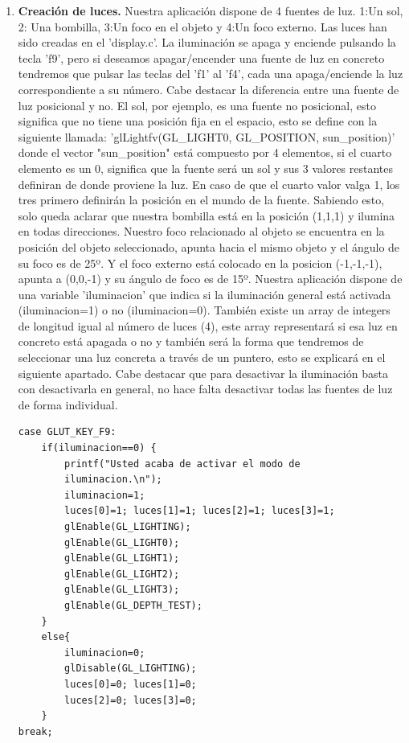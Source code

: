 \documentclass[12pt,a4paper]{article}
\begin{document}
\begin{enumerate}
\item \textbf{Creación de luces.}
Nuestra aplicación dispone de 4 fuentes de luz. 1:Un sol, 2: Una bombilla, 3:Un foco en el objeto y 4:Un foco externo. Las luces han sido creadas en el 'display.c'. La iluminación se apaga y enciende pulsando la tecla 'f9', pero si deseamos apagar/encender una fuente de luz en concreto tendremos que pulsar las teclas del 'f1' al 'f4', cada una apaga/enciende la luz correspondiente a su número.\newline
Cabe destacar la diferencia entre una fuente de luz posicional y no. El sol, por ejemplo, es una fuente no posicional, esto significa que no tiene una posición fija en el espacio, esto se define con la siguiente llamada: 'glLightfv(GL\_LIGHT0, GL\_POSITION, sun\_position)' donde el vector "sun\_position" está compuesto por 4 elementos, si el cuarto elemento es un 0, significa que la fuente será un sol y sus 3 valores restantes definiran de donde proviene la luz. En caso de que el cuarto valor valga 1, los tres primero definirán la posición en el mundo de la fuente.\newline
Sabiendo esto, solo queda aclarar que nuestra bombilla está en la posición {(1,1,1)} y ilumina en todas direcciones. Nuestro foco relacionado al objeto se encuentra en la posición del objeto seleccionado, apunta hacia el mismo objeto y el ángulo de su foco es de 25º. Y el foco externo está colocado en la posicion {(-1,-1,-1)}, apunta a {(0,0,-1)} y su ángulo de foco es de 15º.\newline
Nuestra aplicación dispone de una variable 'iluminacion' que indica si la iluminación general está activada (iluminacion=1) o no (iluminacion=0). También existe un array de integers de longitud igual al número de luces (4), este array representará si esa luz en concreto está apagada o no y también será la forma que tendremos de seleccionar una luz concreta a través de un puntero, esto se explicará en el siguiente apartado.\newline
Cabe destacar que para desactivar la iluminación basta con desactivarla en general, no hace falta desactivar todas las fuentes de luz de forma individual.
\begin{lstlisting}
case GLUT_KEY_F9:
    if(iluminacion==0) {
        printf("Usted acaba de activar el modo de
        iluminacion.\n");
        iluminacion=1;
        luces[0]=1; luces[1]=1; luces[2]=1; luces[3]=1;
        glEnable(GL_LIGHTING);
        glEnable(GL_LIGHT0);
        glEnable(GL_LIGHT1);
        glEnable(GL_LIGHT2);
        glEnable(GL_LIGHT3);
        glEnable(GL_DEPTH_TEST);
    }
    else{
        iluminacion=0;
        glDisable(GL_LIGHTING);
        luces[0]=0; luces[1]=0;
        luces[2]=0; luces[3]=0;
    }
break;


\end{lstlisting}
\end{enumerate}
\end{document}
